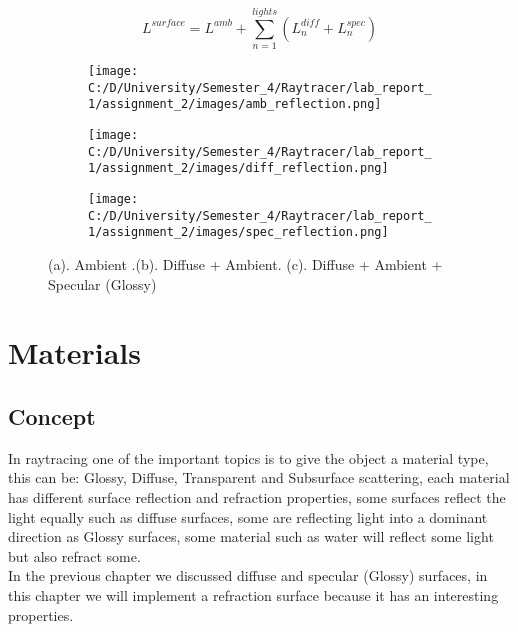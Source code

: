 \documentclass{article}
\begin{document}
\begin{equation}
	L^{surface}= L^{amb} + \sum_{n=1}^{lights} (L_n^{diff} + L_n^{spec})
\end{equation}



\begin{figure}[ht]
	\begin{subfigure}{.3\textwidth}
		\centering
		\texttt{[image: C:/D/University/Semester\_4/Raytracer/lab\_report\_1/assignment\_2/images/amb\_reflection.png]}  
		\caption{}
		\label{fig:sub-first}
	\end{subfigure}
	\begin{subfigure}{.3\textwidth}
		\centering
		\texttt{[image: C:/D/University/Semester\_4/Raytracer/lab\_report\_1/assignment\_2/images/diff\_reflection.png]}  
		\caption{}
		\label{fig:sub-second}
	\end{subfigure}
	\begin{subfigure}{.3\textwidth}
		\centering
		\texttt{[image: C:/D/University/Semester\_4/Raytracer/lab\_report\_1/assignment\_2/images/spec\_reflection.png]}  
		\caption{}
		\label{fig:sub-third}
	\end{subfigure}
	
	\caption{(a). Ambient .(b). Diffuse + Ambient. (c). Diffuse + Ambient + Specular (Glossy)}
	\label{fig:fig}
\end{figure}


\section{Materials}
	      \subsection{Concept}
	      In raytracing one of the important topics is to give the object a material type, this can be: Glossy, Diffuse, Transparent and Subsurface
	      scattering, each material has different surface reflection and refraction properties, some surfaces reflect the light equally such as diffuse surfaces, some are reflecting light into a dominant direction as Glossy surfaces, some material such as water will reflect some light but also refract some.
	      \\ 
	      In the previous chapter we discussed diffuse and specular (Glossy) surfaces, in this chapter we will implement a refraction surface because it has an interesting properties. 
	      
\end{document}
